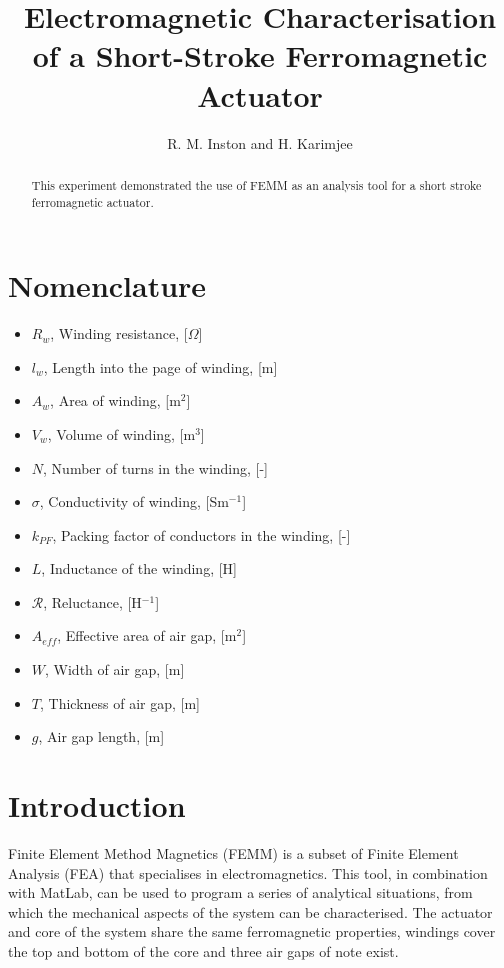 \documentclass[a4paper]{IEEEtran}
\begin{document}
\title{Electromagnetic Characterisation of a Short-Stroke Ferromagnetic Actuator}
\author{R. M. Inston and H. Karimjee}

\maketitle
\begin{abstract}
This experiment demonstrated the use of FEMM as an analysis tool for a short stroke ferromagnetic actuator. 
\end{abstract}

\section{Nomenclature}
\begin{itemize}
\item[]{$R_{w}$, Winding resistance, [$\Omega$]}
\item[]{$l_{w}$, Length into the page of winding, [m]}
\item[]{$A_{w}$, Area of winding, [m$^{2}$]}
\item[]{$V_{w}$, Volume of winding, [m$^{3}$]}
\item[]{$N$, Number of turns in the winding, [-]}
\item[]{$\sigma$, Conductivity of winding, [Sm$^{-1}$]}
\item[]{$k_{PF}$, Packing factor of conductors in the winding, [-]}
\item[]{$L$, Inductance of the winding, [H]}
\item[]{$\mathcal{R}$, Reluctance, [H$^{-1}$]}
\item[]{$A_{eff}$, Effective area of air gap, [m$^{2}$]}
\item[]{$W$, Width of air gap, [m]}
\item[]{$T$, Thickness of air gap, [m]}
\item[]{$g$, Air gap length, [m]}
\end{itemize}

\section{Introduction}
Finite Element Method Magnetics (FEMM) is a subset of Finite Element Analysis (FEA) that specialises in electromagnetics. This tool, in combination with MatLab, can be used to program a series of analytical situations, from which the mechanical aspects of the system can be characterised. The actuator and core of the system share the same ferromagnetic properties, windings cover the top and bottom of the core and three air gaps of note exist.
\end{document}
